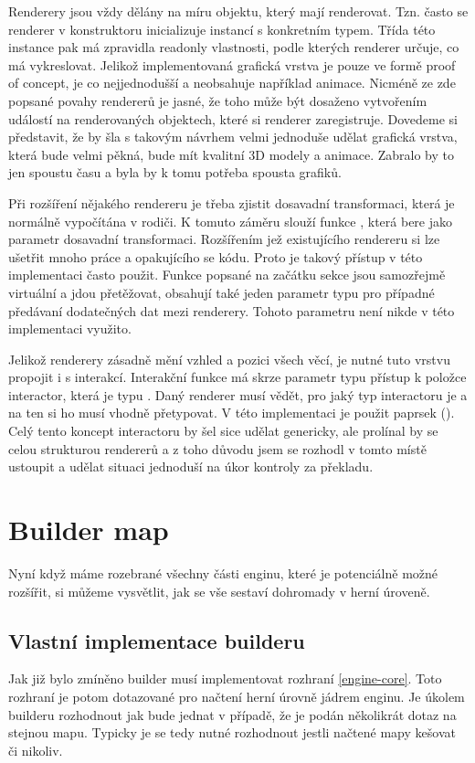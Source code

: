Renderery jsou vždy dělány na míru objektu, který mají renderovat. Tzn. často se renderer v konstruktoru 
inicializuje instancí s konkretním typem. Třída této instance pak má zpravidla readonly vlastnosti,
podle kterých renderer určuje, co má vykreslovat. Jelikož implementovaná grafická vrstva je pouze ve formě proof of concept,
je co nejjednodušší a neobsahuje například animace. Nicméně ze zde popsané povahy rendererů je jasné, že 
toho může být dosaženo vytvořením událostí na renderovaných objektech, které si renderer zaregistruje.
Dovedeme si představit, že by šla s takovým návrhem velmi jednoduše udělat grafická vrstva, která bude
velmi pěkná, bude mít kvalitní 3D modely a animace. Zabralo by to jen spoustu času a byla by k tomu potřeba spousta grafiků.

Při rozšíření nějakého rendereru je třeba zjistit dosavadní transformaci, která je normálně vypočítána v rodiči.
K tomuto záměru slouží funkce , která bere jako parametr dosavadní transformaci.
Rozšířením jež existujícího rendereru si lze ušetřit mnoho práce a opakujícího se kódu. Proto je takový přístup v této implementaci často použit.
Funkce popsané na začátku sekce jsou samozřejmě virtuální a jdou přetěžovat,
obsahují také jeden parametr typu  pro případné předávaní dodatečných dat mezi renderery. Tohoto parametru není nikde v této implementaci využito.

Jelikož renderery zásadně mění vzhled a pozici všech věcí, je nutné tuto vrstvu propojit i s interakcí.
Interakční funkce má skrze parametr typu   přístup k položce interactor, která je typu .
Daný renderer musí vědět, pro jaký typ interactoru je a na ten si ho musí vhodně přetypovat. V této implementaci je použit paprsek  (). 
Celý tento koncept interactoru by šel sice udělat genericky, ale prolínal by se celou strukturou rendererů a z toho
důvodu jsem se rozhodl v tomto místě ustoupit a udělat situaci jednoduší na úkor kontroly za překladu.

\section{Builder map}
Nyní když máme rozebrané všechny části enginu, které je potenciálně možné rozšířit, si můžeme vysvětlit, jak
se vše sestaví dohromady v herní úroveně.

\subsection{Vlastní implementace builderu}
Jak již bylo zmíněno builder musí implementovat rozhraní  \vref{engine-core}. Toto rozhraní je
potom dotazované pro načtení herní úrovně jádrem enginu. Je úkolem builderu rozhodnout jak bude jednat
v případě, že je podán několikrát dotaz na stejnou mapu. Typicky je se tedy nutné rozhodnout
jestli načtené mapy kešovat či nikoliv. 

